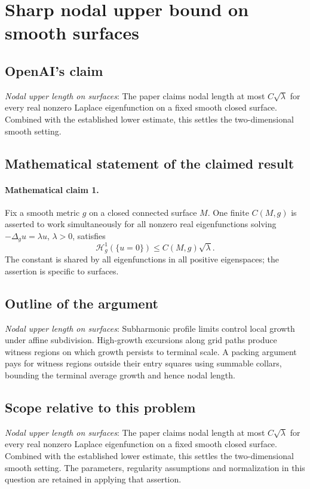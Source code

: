 \documentclass[11pt]{article}
\begin{document}
\section*{Sharp nodal upper bound on smooth surfaces}

\subsection{OpenAI's claim}
\textit{Nodal upper length on surfaces}: The paper claims nodal length at most $C\sqrt\lambda$ for every real nonzero Laplace eigenfunction on a fixed smooth closed surface. Combined with the established lower estimate, this settles the two-dimensional smooth setting.

\subsection{Mathematical statement of the claimed result}
\paragraph{Mathematical claim 1.} Fix a smooth metric $g$ on a closed connected surface $M$. One finite $C(M,g)$ is asserted to work simultaneously for all nonzero real eigenfunctions solving $-\Delta_gu=\lambda u$, $\lambda>0$, satisfies \[\mathcal H_g^1(\{u=0\})\le C(M,g)\sqrt\lambda.\] The constant is shared by all eigenfunctions in all positive eigenspaces; the assertion is specific to surfaces.

\subsection{Outline of the argument}
\textit{Nodal upper length on surfaces}: Subharmonic profile limits control local growth under affine subdivision. High-growth excursions along grid paths produce witness regions on which growth persists to terminal scale. A packing argument pays for witness regions outside their entry squares using summable collars, bounding the terminal average growth and hence nodal length.

\subsection{Scope relative to this problem}
\textit{Nodal upper length on surfaces}: The paper claims nodal length at most $C\sqrt\lambda$ for every real nonzero Laplace eigenfunction on a fixed smooth closed surface. Combined with the established lower estimate, this settles the two-dimensional smooth setting. The parameters, regularity assumptions and normalization in this question are retained in applying that assertion.
\end{document}
